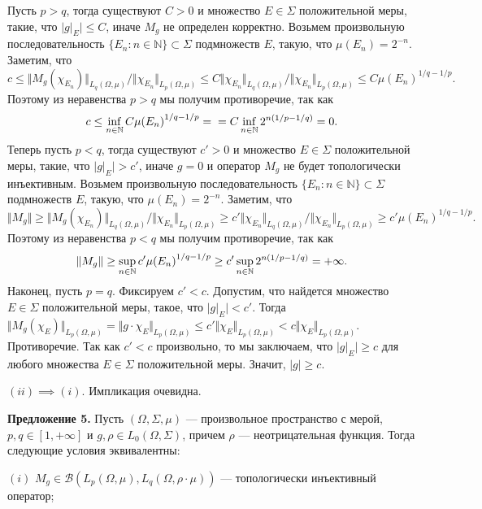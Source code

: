 \documentclass[11pt,twoside]{article}
\begin{document}
    Пусть $p>q$, тогда существуют $C>0$ и множество $E\in\Sigma$
    положительной меры, такие, что $|g|_E|\leq C$, иначе $M_g$ не определен
    корректно. Возьмем произвольную последовательность
$\{E_n:n\in\mathbb{N}\}\subset\Sigma$ подмножеств $E$, такую, что
$\mu(E_n)=2^{-n}$. Заметим, что
$$
    c
    \leq \Vert M_g(\chi_{E_n})\Vert_{L_q(\Omega,\mu)} /
    \Vert \chi_{E_n}\Vert_{L_p(\Omega,\mu)}
    \leq C\Vert\chi_{E_n}\Vert_{L_q(\Omega,\mu)} /
    \Vert \chi_{E_n}\Vert_{L_p(\Omega,\mu)}
    \leq C{\mu(E_n)}^{1/q-1/p}.
$$
Поэтому из неравенства $p>q$ мы получим противоречие, так как
$$
    c \leq\inf_{n\in\mathbb{N}}C{\mu(E_n)}^{1/q-1/p}
    =\\=C\inf_{n\in\mathbb{N}} 2^{n(1/p-1/q)}=0.
$$
Теперь пусть $p<q$, тогда существуют $c'>0$ и множество $E\in\Sigma$
положительной меры, такие, что $|g|_E|>c'$, иначе $g=0$ и оператор $M_g$ не
будет топологически инъективным. Возьмем произвольную последовательность
$\{E_n:n\in\mathbb{N}\}\subset\Sigma$  подмножеств $E$, такую, что
$\mu(E_n)=2^{-n}$. Заметим, что
$$
    \Vert M_g\Vert
    \geq \Vert M_g(\chi_{E_n})\Vert_{L_q(\Omega,\mu)} /
    \Vert \chi_{E_n}\Vert_{L_p(\Omega,\mu)}
    \geq c'\Vert\chi_{E_n}\Vert_{L_q(\Omega,\mu)} /
    \Vert \chi_{E_n}\Vert_{L_p(\Omega,\mu)}
    \geq c'{\mu(E_n)}^{1/q-1/p}.
$$
Поэтому из неравенства $p<q$ мы получим противоречие, так как
$$
    \Vert M_g\Vert
    \geq\sup_{n\in\mathbb{N}}c'{\mu(E_n)}^{1/q-1/p}\\
    \geq c'\sup_{n\in\mathbb{N}}2^{n(1/p-1/q)}
    =+\infty.
$$
Наконец, пусть $p=q$. Фиксируем $c'<c$. Допустим, что найдется множество
$E\in\Sigma$ положительной меры, такое, что $|g|_{E}|<c'$. Тогда $\Vert
    M_g(\chi_{E})\Vert_{L_p(\Omega,\mu)} =\Vert g
    \cdot\chi_{E}\Vert_{L_p(\Omega,\mu)} \leq c' \Vert
    \chi_{E}\Vert_{L_p(\Omega,\mu)} <c\Vert \chi_{E}\Vert_{L_p(\Omega,\mu)}$.
Противоречие. Так как $c'<c$ произвольно, то мы заключаем, что $|g|_E|\geq c$
для любого множества $E\in\Sigma$ положительной меры. Значит, $|g|\geq c$.

$(ii)$$\implies$$ (i)$. Импликация очевидна.

\textbf{Предложение 5.} Пусть $(\Omega,\Sigma,\mu)$ --- произвольное
пространство с мерой, $p,q\in[1,+\infty]$ и $g,\rho\in
L_0(\Omega,\Sigma)$, причем $\rho$ --- неотрицательная функция. Тогда
следующие условия эквивалентны:

$(i)$ $M_g\in\mathcal{B}(L_p(\Omega,\mu),L_q(\Omega,\rho\cdot\mu))$ ---
топологически инъективный оператор;
\end{document}
